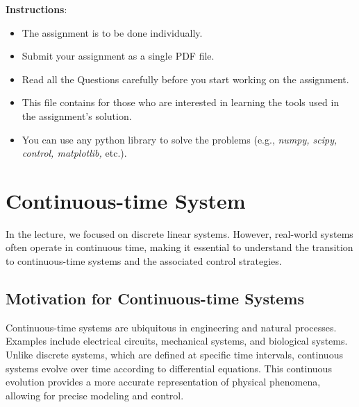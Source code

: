 \documentclass[a4 paper]{article}
\begin{document}
\textbf{Instructions}: 
\begin{itemize}
    \item The assignment is to be done individually.
    \item Submit your assignment as a single PDF file.
    \item Read all the Questions carefully before you start working on the assignment.
    \item This file contains  for those who are interested in learning the tools used in the 
        assignment's solution. 
    \item You can use any python library to solve the problems (e.g., \textit{numpy, scipy, control, matplotlib,} etc.).
\end{itemize}

\section{Continuous-time System}

In the lecture, we focused on discrete linear systems. However, real-world systems often operate in continuous time, 
making it essential to understand the transition to continuous-time systems and the associated control strategies.

\subsection{Motivation for Continuous-time Systems}
Continuous-time systems are ubiquitous in engineering and natural processes. Examples include electrical circuits, 
mechanical systems, and biological systems. Unlike discrete systems, which are defined at specific time intervals, 
continuous systems evolve over time according to differential equations. This continuous evolution provides a more 
accurate representation of physical phenomena, allowing for precise modeling and control.
\end{document}
